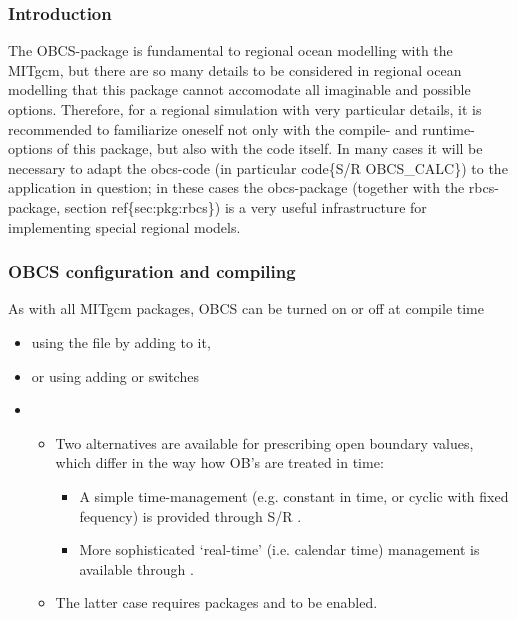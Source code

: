 \documentclass[letterpaper,10pt,english]{sphinxmanual}
\begin{document}
\subsubsection{Introduction}
\label{\detokenize{phys_pkgs/phys_pkgs:introduction}}\label{\detokenize{phys_pkgs/phys_pkgs:pkg-obcs-intro}}
The OBCS-package is fundamental to regional ocean modelling with the
MITgcm, but there are so many details to be considered in
regional ocean modelling that this package cannot accomodate all
imaginable and possible options. Therefore, for a regional simulation
with very particular details, it is recommended to familiarize oneself
not only with the compile- and runtime-options of this package, but
also with the code itself. In many cases it will be necessary to adapt
the obcs-code (in particular code\{S/R OBCS\_CALC\}) to the application
in question; in these cases the obcs-package (together with the
rbcs-package, section ref\{sec:pkg:rbcs\}) is a very
useful infrastructure for implementing special regional models.


\subsubsection{OBCS configuration and compiling}
\label{\detokenize{phys_pkgs/phys_pkgs:pkg-obcs-config-compiling}}\label{\detokenize{phys_pkgs/phys_pkgs:obcs-configuration-and-compiling}}
As with all MITgcm packages, OBCS can be turned on or off
at compile time
\begin{itemize}
\item {} 
using the  file by adding  to it,

\item {} 
or using  adding  or  switches

\item {} 
\begin{itemize}
\item {} 
Two alternatives are available for prescribing open boundary values, which differ in the way how OB's are treated in time:
\begin{itemize}
\item {} 
A simple time-management (e.g. constant in time, or cyclic with fixed fequency) is provided through S/R .

\item {} 
More sophisticated `real-time' (i.e. calendar time) management is available through .

\end{itemize}

\item {} 
The latter case requires packages  and  to be enabled.

\end{itemize}

\end{itemize}
\end{document}
